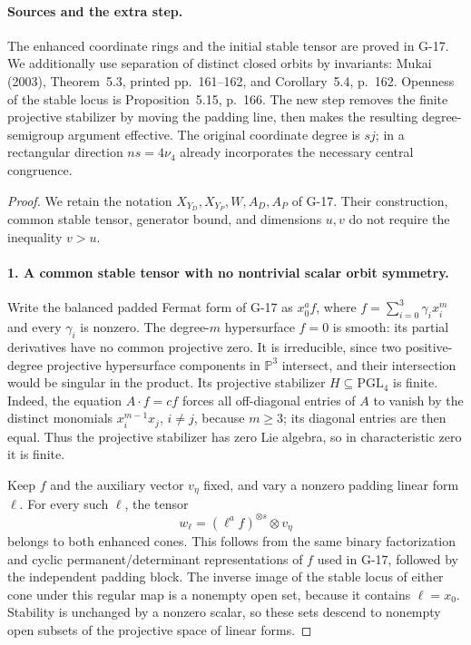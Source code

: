 \documentclass[11pt,a4paper]{article}
\theoremstyle{definition}\newtheorem{definition}{Definition}
\begin{document}
\paragraph{Sources and the extra step.}
The enhanced coordinate rings and the initial stable tensor are
proved in G-17. We additionally use separation of distinct closed
orbits by invariants: Mukai (2003), Theorem~5.3, printed pp.~161--162,
and Corollary~5.4, p.~162. Openness of the stable locus is
Proposition~5.15, p.~166. The new step removes the finite projective
stabilizer by moving the padding line, then makes the resulting
degree-semigroup argument effective. The original coordinate degree
is $sj$; in a rectangular direction $ns=4\nu_4$ already incorporates
the necessary central congruence.

\begin{proof}
We retain the notation $X_{Y_D},X_{Y_P},W,A_D,A_P$ of G-17.
Their construction, common stable tensor, generator bound, and
dimensions $u,v$ do not require the inequality $v>u$.

\paragraph{1. A common stable tensor with no nontrivial scalar orbit symmetry.}
Write the balanced padded Fermat form of G-17 as $x_0^a f$, where
$f=\sum_{i=0}^3\gamma_i x_i^m$ and every $\gamma_i$ is nonzero.
The degree-$m$ hypersurface $f=0$ is smooth: its partial derivatives
have no common projective zero. It is irreducible, since two
positive-degree projective hypersurface components in $\mathbb P^3$
intersect, and their intersection would be singular in the product.
Its projective stabilizer $H\subseteq\mathrm{PGL}_4$ is finite.
Indeed, the equation $A\cdot f=cf$ forces all off-diagonal entries
of $A$ to vanish by the distinct monomials $x_i^{m-1}x_j$,
$i\ne j$, because $m\geq3$; its diagonal entries are then equal.
Thus the projective stabilizer has zero Lie algebra, so in
characteristic zero it is finite.

Keep $f$ and the auxiliary vector $v_\eta$ fixed, and vary a nonzero
padding linear form $\ell$. For every such $\ell$, the tensor
\[
 w_\ell=(\ell^a f)^{\otimes s}\otimes v_\eta
\]
belongs to both enhanced cones. This follows from the same binary
factorization and cyclic permanent/determinant representations of
$f$ used in G-17, followed by the independent padding block.
The inverse image of the stable locus of either cone under this
regular map is a nonempty open set, because it contains $\ell=x_0$.
Stability is unchanged by a nonzero scalar, so these sets descend
to nonempty open subsets of the projective space of linear forms.


\end{proof}
\end{document}
